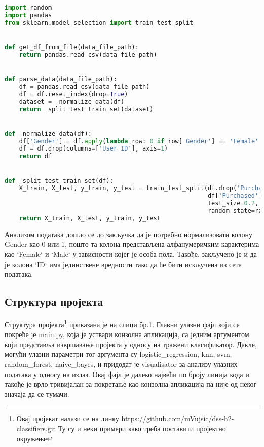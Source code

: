 \documentclass[11pt]{article} %
\begin{document}
\begin{lstlisting}[language=Python,title=Пример 1. /processing/dataset\_process - `припремање података`]
import random
import pandas
from sklearn.model_selection import train_test_split


def get_df_from_file(data_file_path):
    return pandas.read_csv(data_file_path)


def parse_data(data_file_path):
    df = pandas.read_csv(data_file_path)
    df = df.reset_index(drop=True)
    dataset = _normalize_data(df)
    return _split_test_train_set(dataset)


def _normalize_data(df):
    df['Gender'] = df.apply(lambda row: 0 if row['Gender'] == 'Female' else 1, axis=1)
    df = df.drop(columns=['User ID'], axis=1)
    return df


def _split_test_train_set(df):
    X_train, X_test, y_train, y_test = train_test_split(df.drop('Purchased', axis=1),
                                                        df['Purchased'],
                                                        test_size=0.2,
                                                        random_state=random.randint(10, 332))
    return X_train, X_test, y_train, y_test


\end{lstlisting}

Анализом података дошло се до закључка да је потребно нормализовати колону Gender као 0 или 1, пошто та колона представљена алфанумеричким карактерима као `Female` и `Male` у зависности којег је особа пола. Такође, закључено је и да је колона `ID` има јединствене вредности тако да ће бити искључена из сета података. 

\subsection{Структура пројекта}

Структура пројекта\footnote{Овај пројекат налази се на линку https://github.com/mVujsic/dss-h2-classifiers.git Ту су и неки примери како треба поставити пројектно окружење} приказана је на слици бр.1. Главни улазни фајл који се покреће је main.py, која је уствари конзолна апликација, са једним аргументом који представља извршавање пројекта у односу на тражени класификатор. Дакле, могући улазни параметри тог аргумента су logistic\_regression, knn, svm, random\_forest, naive\_bayes, и придодат је visualisator за анализу улазних података у односу на излаз. Овај фајл је далеко највећи по броју линија кода и такође је врло тривијалан за покретање као конзолна апликација па није од неког значаја да се тумачи.
\end{document}
